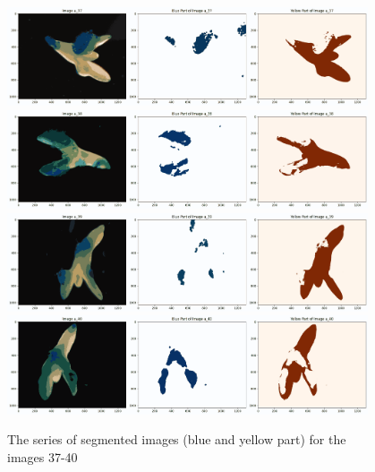 \documentclass{article}
\begin{document}
\begin{figure}[h!]
\centering
\includegraphics[width=0.95\textwidth]{Report/Images/Appendix Images/ColorSegments/Image37.png}
\includegraphics[width=0.95\textwidth]{Report/Images/Appendix Images/ColorSegments/Image38.png}
\includegraphics[width=0.95\textwidth]{Report/Images/Appendix Images/ColorSegments/Image39.png}
\includegraphics[width=0.95\textwidth]{Report/Images/Appendix Images/ColorSegments/Image40.png}
\caption{The series of segmented images (blue and yellow part) for the images 37-40} 
\label{fig:segment37-40}
\end{figure}
\end{document}

